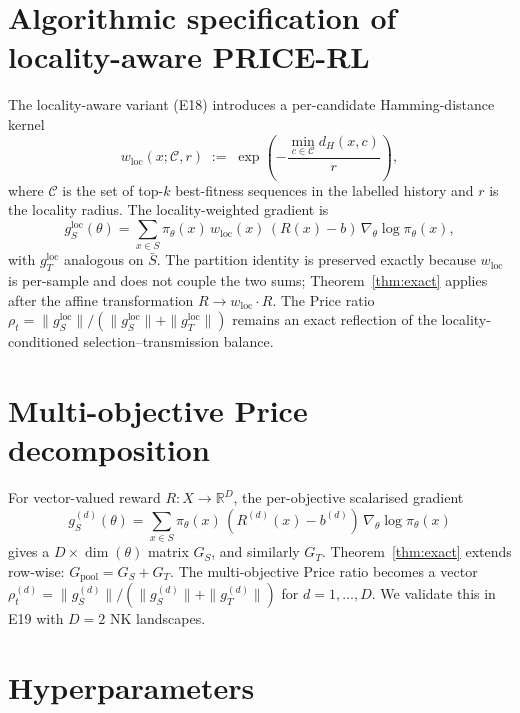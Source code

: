 \section{Algorithmic specification of locality-aware PRICE-RL}
\label{app:locality}

The locality-aware variant (E18) introduces a per-candidate Hamming-distance kernel
\[
w_{\mathrm{loc}}(x; \mathcal C, r) \;:=\; \exp\!\left( -\frac{\min_{c \in \mathcal C} d_H(x, c)}{r} \right),
\]
where $\mathcal C$ is the set of top-$k$ best-fitness sequences in the labelled history and $r$ is the locality radius. The locality-weighted gradient is
\[
g_S^{\mathrm{loc}}(\theta) = \sum_{x \in S} \pi_\theta(x)\, w_{\mathrm{loc}}(x)\, (R(x) - b)\, \nabla_\theta \log\pi_\theta(x),
\]
with $g_T^{\mathrm{loc}}$ analogous on $\bar S$. The partition identity is preserved exactly because $w_{\mathrm{loc}}$ is per-sample and does not couple the two sums; Theorem~\ref{thm:exact} applies after the affine transformation $R \to w_{\mathrm{loc}} \cdot R$. The Price ratio $\rho_t = \|g_S^{\mathrm{loc}}\|/(\|g_S^{\mathrm{loc}}\| + \|g_T^{\mathrm{loc}}\|)$ remains an exact reflection of the locality-conditioned selection--transmission balance.

\section{Multi-objective Price decomposition}
\label{app:moo}

For vector-valued reward $R: X \to \mathbb{R}^D$, the per-objective scalarised gradient
\[
g_S^{(d)}(\theta) = \sum_{x\in S} \pi_\theta(x)\,(R^{(d)}(x) - b^{(d)})\,\nabla_\theta \log\pi_\theta(x)
\]
gives a $D \times \dim(\theta)$ matrix $G_S$, and similarly $G_T$. Theorem~\ref{thm:exact} extends row-wise: $G_{\mathrm{pool}} = G_S + G_T$. The multi-objective Price ratio becomes a vector $\rho^{(d)}_t = \|g_S^{(d)}\| / (\|g_S^{(d)}\| + \|g_T^{(d)}\|)$ for $d = 1, \dots, D$. We validate this in E19 with $D=2$ NK landscapes.

\section{Hyperparameters}
\label{app:hp}

